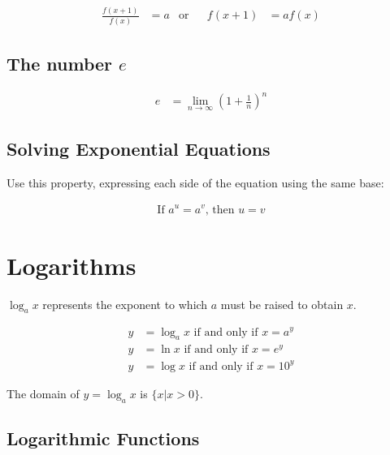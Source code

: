 \documentclass[
12pt, %
letterpaper, %
fleqn, %
notitlepage %
]{article}
\numberwithin{equation}{section} %
\numberwithin{figure}{section} %
\numberwithin{table}{section} %
\begin{document}
\begin{align}
	\frac{f(x+1)}{f(x)} &= a & \text{or} && f(x+1)&=af(x)
\end{align}


\subsection*{The number $e$}

\begin{align}
	e&=\lim_{n\to\infty}\left(1+\frac{1}{n}\right)^n
\end{align}


\subsection*{Solving Exponential Equations}

Use this property, expressing each side of the equation using the same base:

\begin{align}
	\text{If }a^u=a^v\text{, then }u=v
\end{align}


\section{Logarithms}


$\log_{a}x$ represents the exponent to which $a$ must be raised to obtain $x$.

\begin{align}
	y &=\log_{a}x\text{ if and only if }x=a^y \\
	y &=\ln{x}\text{ if and only if }x=e^y \\
	y &=\log{x}\text{ if and only if }x=10^y
\end{align}

The domain of $y=\log_{a}x$ is $\{x|x>0\}$.


\subsection*{Logarithmic Functions}
\end{document}
